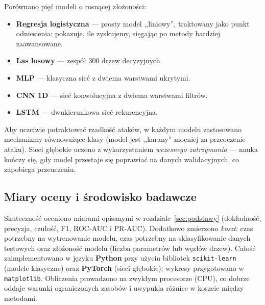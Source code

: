 Porównano pięć modeli o rosnącej złożoności:
\begin{itemize}
  \item \textbf{Regresja logistyczna} --- prosty model ,,liniowy'', traktowany
        jako punkt odniesienia: pokazuje, ile zyskujemy, sięgając po metody
        bardziej zaawansowane.
  \item \textbf{Las losowy} --- zespół 300 drzew decyzyjnych.
  \item \textbf{MLP} --- klasyczna sieć z dwiema warstwami ukrytymi.
  \item \textbf{CNN 1D} --- sieć konwolucyjna z dwiema warstwami filtrów.
  \item \textbf{LSTM} --- dwukierunkowa sieć rekurencyjna.
\end{itemize}
Aby uczciwie potraktować rzadkość ataków, w każdym modelu zastosowano
mechanizmy równoważące klasy (model jest ,,karany'' mocniej za przeoczenie
ataku). Sieci głębokie uczono z wykorzystaniem \emph{wczesnego zatrzymania} ---
nauka kończy się, gdy model przestaje się poprawiać na danych walidacyjnych, co
zapobiega przeuczeniu.

\subsection{Miary oceny i środowisko badawcze}

Skuteczność oceniono miarami opisanymi w rozdziale~\ref{sec:podstawy}
(dokładność, precyzja, czułość, F1, ROC-AUC i PR-AUC). Dodatkowo zmierzono
\emph{koszt}: czas potrzebny na wytrenowanie modelu, czas potrzebny na
sklasyfikowanie danych testowych oraz złożoność modelu (liczba parametrów lub
węzłów drzew). Całość zaimplementowano w języku \textbf{Python} przy użyciu
bibliotek \texttt{scikit-learn} (modele klasyczne) oraz \textbf{PyTorch} (sieci
głębokie); wykresy przygotowano w \texttt{matplotlib}. Obliczenia prowadzono na
zwykłym procesorze (CPU), co dobrze oddaje warunki ograniczonych zasobów i
uwypukla różnice w koszcie między metodami.
